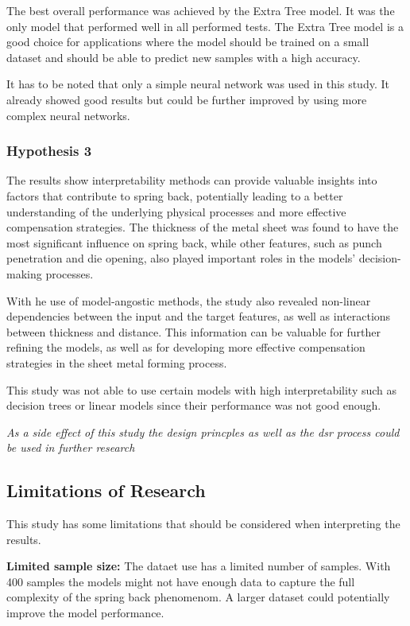 The best overall performance was achieved by the Extra Tree model.
It was the only model that performed well in all performed tests.
The Extra Tree model is a good choice for applications where the model should be trained on a small dataset and
should be able to predict new samples with a high accuracy.

It has to be noted that only a simple neural network was used in this study.
It already showed good results but could be further improved by using more complex neural networks.

\subsubsection{Hypothesis 3}
The results show interpretability methods can provide valuable insights into factors that contribute to spring back,
potentially leading to a better understanding of the underlying physical processes and more effective compensation
strategies.
The thickness of the metal sheet was found to have the most significant influence on spring back, while other
features, such as punch penetration and die opening, also played important roles in the models' decision-making
processes.

With he use of model-angostic methods, the study also revealed non-linear dependencies between the input and the
target features, as well as interactions between thickness and distance.
This information can be valuable for further refining the models, as well as for developing more effective
compensation strategies in the sheet metal forming process.

This study was not able to use certain models with high interpretability such as decision trees or linear models
since their performance was not good enough.



\textit{As a side effect of this study the design princples as well as the dsr process could be used in further
research}

\subsection{Limitations of Research}\label{subsec:limitations-of-research}
This study has some limitations that should be considered when interpreting the results.

\textbf{Limited sample size:} The dataet use has a limited number of samples.
With 400 samples the models might not have enough data to capture the full complexity of the spring back phenomenom.
A larger dataset could potentially improve the model performance.

